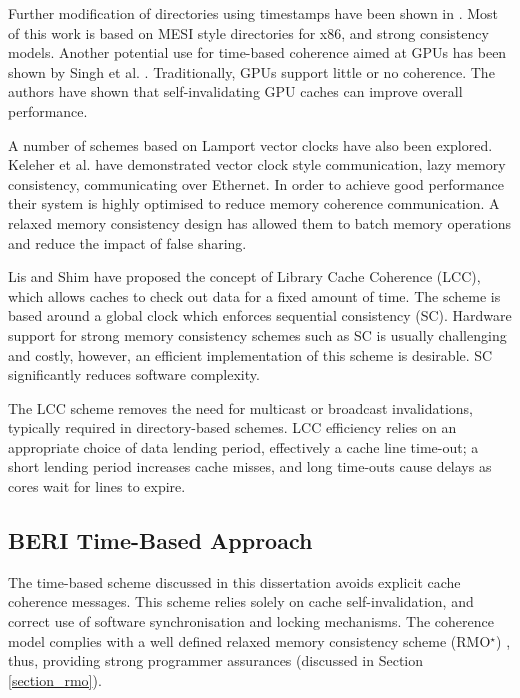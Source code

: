 				Further modification of directories using timestamps have been shown in \cite{Shim11,Choi11,Sung15}. Most of this work is based on MESI style directories for x86, and strong consistency models. 
				Another potential use for time-based coherence aimed at GPUs has been shown by Singh et al. \cite{Singh13,Singh14}. Traditionally, GPUs support little or no coherence. The authors have shown that self-invalidating GPU caches can improve overall performance. 

				A number of schemes based on Lamport \cite{Lamport78} vector clocks have also been explored. Keleher et al. \cite{Keleher94} have demonstrated vector clock style communication, lazy memory consistency, communicating over Ethernet. In order to achieve good performance their system is highly optimised to reduce memory coherence communication. A relaxed memory consistency design has allowed them to batch memory operations and reduce the impact of false sharing. 
				
				Lis and Shim \cite{Shim11,Lis11} have proposed the concept of Library Cache Coherence (LCC), which allows caches to check out data for a fixed amount of time. The scheme is based around a global clock which enforces sequential consistency (SC). Hardware support for strong memory consistency schemes such as SC is usually challenging and costly, however, an efficient implementation of this scheme is desirable. SC significantly reduces software complexity. 
				
				The LCC scheme removes the need for multicast or broadcast invalidations, typically required in directory-based schemes. LCC efficiency relies on an appropriate choice of data lending period, effectively a cache line time-out; a short lending period increases cache misses, and long time-outs cause delays as cores wait for lines to expire. 
				
			\subsection{BERI Time-Based Approach}
				The time-based scheme discussed in this dissertation avoids explicit cache coherence messages. 
				This scheme relies solely on cache self-invalidation, and correct use of software synchronisation and locking mechanisms. 
				The coherence model complies with a well defined relaxed memory consistency scheme (RMO{\large$^\star$}) \cite{SPARCInternational94}, thus, providing strong programmer assurances (discussed in Section \ref{section_rmo}).
				
